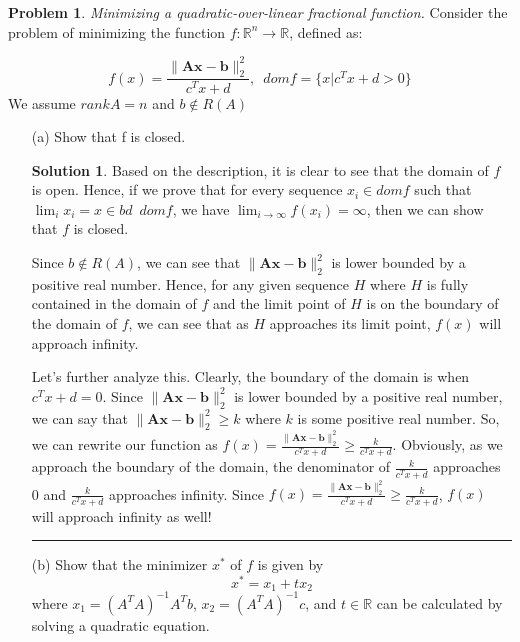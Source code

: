 \documentclass{article}
\theoremstyle{definition}
\newtheorem{problem}{Problem}
\def\fline{\rule{0.75\linewidth}{0.5pt}}
\newcommand{\finishline}{\begin{center}\fline\end{center}}
\newtheorem*{solution*}{Solution}
\newenvironment{solution}{\begin{solution*}}{{\finishline} \end{solution*}}
\begin{document}
\begin{problem}
    \textit{Minimizing a quadratic-over-linear fractional function.} Consider the problem of minimizing the function $f: \mathbb{R}^n \rightarrow \mathbb{R}$, defined as:

    \begin{equation}
                        \label{eq:example}
                            f(x) = \frac{\|\mathbf{Ax - b}\|^2_2}{c^Tx + d}, \enspace dom f = \{x | c^Tx + d > 0\}
                    \end{equation}
We assume $rank A = n$ and $b \notin R(A)$ 

\begin{enumerate}
    \item[(a)] Show that f is closed.
    \begin{solution}
        Based on the description, it is clear to see that the domain of $f$ is open. Hence, if we prove that for every sequence $x_i \in dom f$ such that $\lim_{i} x_i = x \in bd \enspace dom f$, we have $\lim_{i\to\infty} f(x_i) = \infty$, then we can show that $f$ is closed. \newline 

        Since $b \notin R(A)$, we can see that $\|\mathbf{Ax - b}\|^2_2$ is lower bounded by a positive real number. Hence, for any given sequence $H$ where $H$ is fully contained in the domain of $f$ and the limit point of $H$ is on the boundary of the domain of $f$, we can see that as $H$ approaches its limit point, $f(x)$ will approach infinity. \newline 

        Let's further analyze this. Clearly, the boundary of the domain is when $c^Tx + d = 0$. Since $\|\mathbf{Ax - b}\|^2_2$  is lower bounded by a positive real number, we can say that $\|\mathbf{Ax - b}\|^2_2 \geq k$ where $k$ is some positive real number. So, we can rewrite our function as  $f(x) = \frac{\|\mathbf{Ax - b}\|^2_2}{c^Tx + d} \geq \frac{k}{c^Tx + d}$. Obviously, as we approach the boundary of the domain, the denominator of $\frac{k}{c^Tx + d}$ approaches 0 and $\frac{k}{c^Tx + d}$ approaches infinity. Since $f(x) = \frac{\|\mathbf{Ax - b}\|^2_2}{c^Tx + d} \geq \frac{k}{c^Tx + d}$, $f(x)$ will approach infinity as well! 
    \end{solution}
    \item[(b)] Show that the minimizer $x^*$ of $f$ is given by 
    \begin{equation}
                        \label{eq:example}
                            x^* = x_1 + tx_2
                    \end{equation}
    where $x_1 = (A^TA)^{-1} A^Tb$, $x_2 = (A^TA)^{-1}c$, and $t \in \mathbb{R}$ can be calculated by solving a quadratic equation.


\end{enumerate}
\end{problem}
\end{document}
